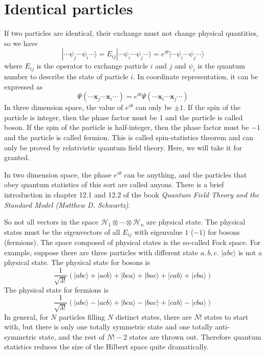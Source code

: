 \documentclass[cyan]{elegantnote}
\begin{document}
\section{Identical particles}
If two particles are identical, their exchange must not change physical quantities, so we have
\[|\cdots\psi_j\cdots\psi_i\cdots\rangle = E_{ij}|\cdots\psi_i\cdots\psi_j\cdots\rangle = e^{i\theta} |\cdots\psi_i\cdots\psi_j\cdots\rangle\]
where $E_{ij}$ is the operator to exchange particle $i$ and $j$ and $\psi_i$ is the quantum number to describe the state of particle $i$.
In coordinate representation, it can be expressed as
\[\Psi(\cdots\bm{x}_j\cdots\bm{x}_i\cdots) = e^{i\theta} \Psi(\cdots\bm{x}_i\cdots\bm{x}_j\cdots)\]
In three dimension space, the value of $e^{i\theta}$ can only be $\pm 1$. If the spin of the particle is integer, then the phase factor must be $1$ and the particle is called boson. If the spin of the particle is half-integer, then the phase factor must be $-1$ and the particle is called fermion. This is called spin-statistics theorem and can only be proved by relativistic quantum field theory. Here, we will take it for granted.
\begin{note}
In two dimension space, the phase $e^{i\theta}$ can be anything, and the particles that obey quantum statistics of this sort are called anyons. There is a brief introduction in chapter 12.1 and
12.2 of the book \emph{Quantum Field Theory and the Standard Model (Matthew D. Schwartz)}.
\end{note}
\noindent
So not all vectors in the space $\mathcal{H}_1\otimes\cdots\otimes\mathcal{H}_n$ are physical state. The physical states must be the eigenvectors of all $E_{ij}$ with eigenvalue $1$ ($-1$) for bosons (fermions). The space composed of physical states is the so-called Fock space. For example, suppose there are three particles with different state $a,b,c$. $|abc\rangle$ is not a physical state. The physical state for bosons is
\[\frac{1}{\sqrt{3!}} \left( |abc\rangle + |acb\rangle + |bca\rangle + |bac\rangle + |cab\rangle + |cba\rangle\right)\]
The physical state for fermions is
\[\frac{1}{\sqrt{3!}} \left( |abc\rangle - |acb\rangle + |bca\rangle - |bac\rangle + |cab\rangle - |cba\rangle\right)\]
In general, for $N$ particles filling $N$ distinct states, there are $N!$ states to start with, but there is only one totally symmetric state and one totally anti-symmetric state, and the rest of $N!-2$ states are thrown out. Therefore quantum statistics reduces the size of the Hilbert space quite dramatically.\\
\end{document}
